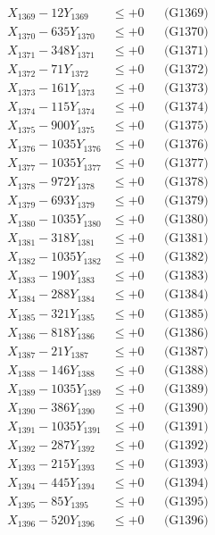 \documentclass[a4paper,10pt]{article}
\begin{document}
{\begin{align}
X_{1369} - 12Y_{1369} &\leq +0 && \text{(G1369)} \\
X_{1370} - 635Y_{1370} &\leq +0 && \text{(G1370)} \\
\allowbreak
X_{1371} - 348Y_{1371} &\leq +0 && \text{(G1371)} \\
X_{1372} - 71Y_{1372} &\leq +0 && \text{(G1372)} \\
X_{1373} - 161Y_{1373} &\leq +0 && \text{(G1373)} \\
X_{1374} - 115Y_{1374} &\leq +0 && \text{(G1374)} \\
X_{1375} - 900Y_{1375} &\leq +0 && \text{(G1375)} \\
X_{1376} - 1035Y_{1376} &\leq +0 && \text{(G1376)} \\
X_{1377} - 1035Y_{1377} &\leq +0 && \text{(G1377)} \\
X_{1378} - 972Y_{1378} &\leq +0 && \text{(G1378)} \\
X_{1379} - 693Y_{1379} &\leq +0 && \text{(G1379)} \\
X_{1380} - 1035Y_{1380} &\leq +0 && \text{(G1380)} \\
\allowbreak
X_{1381} - 318Y_{1381} &\leq +0 && \text{(G1381)} \\
X_{1382} - 1035Y_{1382} &\leq +0 && \text{(G1382)} \\
X_{1383} - 190Y_{1383} &\leq +0 && \text{(G1383)} \\
X_{1384} - 288Y_{1384} &\leq +0 && \text{(G1384)} \\
X_{1385} - 321Y_{1385} &\leq +0 && \text{(G1385)} \\
X_{1386} - 818Y_{1386} &\leq +0 && \text{(G1386)} \\
X_{1387} - 21Y_{1387} &\leq +0 && \text{(G1387)} \\
X_{1388} - 146Y_{1388} &\leq +0 && \text{(G1388)} \\
X_{1389} - 1035Y_{1389} &\leq +0 && \text{(G1389)} \\
X_{1390} - 386Y_{1390} &\leq +0 && \text{(G1390)} \\
\allowbreak
X_{1391} - 1035Y_{1391} &\leq +0 && \text{(G1391)} \\
X_{1392} - 287Y_{1392} &\leq +0 && \text{(G1392)} \\
X_{1393} - 215Y_{1393} &\leq +0 && \text{(G1393)} \\
X_{1394} - 445Y_{1394} &\leq +0 && \text{(G1394)} \\
X_{1395} - 85Y_{1395} &\leq +0 && \text{(G1395)} \\
X_{1396} - 520Y_{1396} &\leq +0 && \text{(G1396)} \\

\end{align}}
\end{document}
